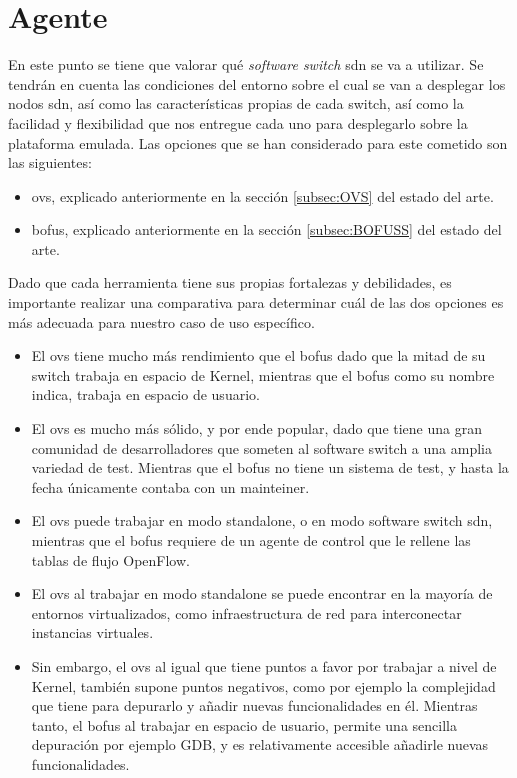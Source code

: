 \section{Agente }
\label{sec:ana_switch}

En este punto se tiene que valorar qué \textit{software switch} \gls{sdn} se va a utilizar. Se tendrán en cuenta las condiciones del entorno sobre el cual se van a desplegar los nodos \gls{sdn}, así como las características propias de cada switch, así como la facilidad y flexibilidad que nos entregue cada uno para desplegarlo sobre la plataforma emulada. Las opciones que se han considerado para este cometido son las siguientes:

\begin{itemize}
    \item \gls{ovs}, explicado anteriormente en la sección \ref{subsec:OVS} del estado del arte.

    \item \gls{bofus}, explicado anteriormente en la sección \ref{subsec:BOFUSS} del estado del arte.
\end{itemize}

Dado que cada herramienta tiene sus propias fortalezas y debilidades, es importante realizar una comparativa para determinar cuál de las dos opciones es más adecuada para nuestro caso de uso específico.

\begin{itemize}
    \item El \gls{ovs} tiene mucho más rendimiento que el \gls{bofus} dado que la mitad de su switch trabaja en espacio de Kernel, mientras que el \gls{bofus} como su nombre indica, trabaja en espacio de usuario.
    \item El \gls{ovs} es mucho más sólido, y por ende popular, dado que tiene una gran comunidad de desarrolladores que someten al software switch a una amplia variedad de test. Mientras que el \gls{bofus} no tiene un sistema de test, y hasta la fecha únicamente contaba con un mainteiner.
    \item El \gls{ovs} puede trabajar en modo standalone, o en modo software switch \gls{sdn}, mientras que el \gls{bofus} requiere de un agente de control que le rellene las tablas de flujo OpenFlow.
    \item El \gls{ovs} al trabajar en modo standalone se puede encontrar en la mayoría de entornos virtualizados, como infraestructura de red para interconectar instancias virtuales.
    \item Sin embargo, el \gls{ovs} al igual que tiene puntos a favor por trabajar a nivel de Kernel, también supone puntos negativos, como por ejemplo la complejidad que tiene para depurarlo y añadir nuevas funcionalidades en él. Mientras tanto, el \gls{bofus} al trabajar en espacio de usuario, permite una sencilla  depuración por ejemplo GDB, y es relativamente accesible añadirle nuevas funcionalidades.
\end{itemize}

